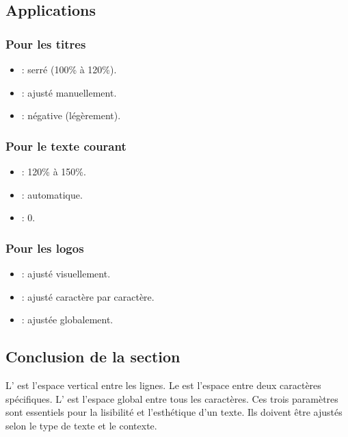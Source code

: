 \subsection{Applications}

\subsubsection{Pour les titres}

\begin{itemize}
    \item {} : serré (100\% à 120\%).
    \item {} : ajusté manuellement.
    \item {} : négative (légèrement).
\end{itemize}

\subsubsection{Pour le texte courant}

\begin{itemize}
    \item {} : 120\% à 150\%.
    \item {} : automatique.
    \item {} : 0.
\end{itemize}

\subsubsection{Pour les logos}

\begin{itemize}
    \item {} : ajusté visuellement.
    \item {} : ajusté caractère par caractère.
    \item {} : ajustée globalement.
\end{itemize}

\subsection*{Conclusion de la section}

\begin{retenir}
L' est l'espace vertical entre les lignes. Le  est l'espace entre deux caractères spécifiques. L' est l'espace global entre tous les caractères. Ces trois paramètres sont essentiels pour la lisibilité et l'esthétique d'un texte. Ils doivent être ajustés selon le type de texte et le contexte.
\end{retenir}

